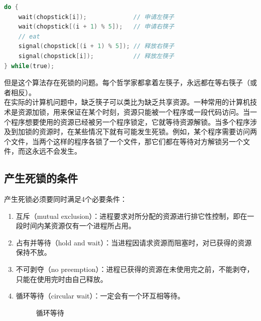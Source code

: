 \vspace{-0.5cm}

\begin{lstlisting}[language=C]
do {
	wait(chopstick[i]);				// 申请左筷子
	wait(chopstick[(i + 1) % 5]);	// 申请右筷子
	// eat
	signal(chopstick[(i + 1) % 5]); // 释放右筷子
	signal(chopstick[i]);			// 释放左筷子
} while(true);
\end{lstlisting}

但是这个算法存在死锁的问题。每个哲学家都拿着左筷子，永远都在等右筷子（或者相反）。\\

在实际的计算机问题中，缺乏筷子可以类比为缺乏共享资源。一种常用的计算机技术是资源加锁，用来保证在某个时刻，资源只能被一个程序或一段代码访问。当一个程序想要使用的资源已经被另一个程序锁定，它就等待资源解锁。当多个程序涉及到加锁的资源时，在某些情况下就有可能发生死锁。例如，某个程序需要访问两个文件，当两个这样的程序各锁了一个文件，那它们都在等待对方解锁另一个文件，而这永远不会发生。\\

\subsection{产生死锁的条件}

产生死锁必须要同时满足4个必要条件：

\begin{enumerate}
    \item 互斥（mutual exclusion）：进程要求对所分配的资源进行排它性控制，即在一段时间内某资源仅有一个进程所占用。

    \item 占有并等待（hold and wait）：当进程因请求资源而阻塞时，对已获得的资源保持不放。

    \item 不可剥夺（no preemption）：进程已获得的资源在未使用完之前，不能剥夺，只能在使用完时由自己释放。

    \item 循环等待（circular wait）：一定会有一个环互相等待。

          \begin{figure}[H]
              \centering
              \caption{循环等待}
          \end{figure}
\end{enumerate}

